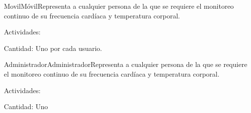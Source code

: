 \begin{actor}{Movil}{Móvil}{Representa a cualquier persona de la que se requiere el monitoreo continuo de su frecuencia cardíaca y temperatura corporal.}
	\item[Actividades:]
	\item[Cantidad:] Uno por cada usuario.
	
\end{actor}

\begin{actor}{Administrador}{Administrador}{Representa a cualquier persona de la que se requiere el monitoreo continuo de su frecuencia cardíaca y temperatura corporal.}
	\item[Actividades:]
	\item[Cantidad:] Uno
	
\end{actor}
%
%	
%	
%
%	

